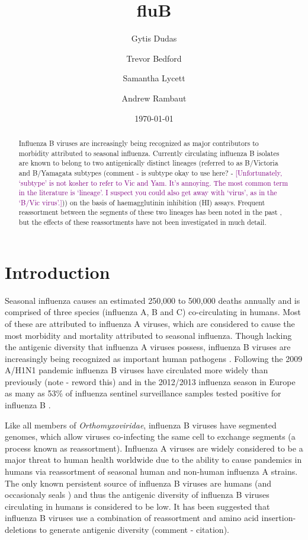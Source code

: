 \documentclass[11pt,oneside,letterpaper]{article}
\title{\vspace{1.0cm} \LARGE \bf fluB}
\author[1]{Gytis Dudas}
\author[1]{Trevor Bedford}
\author[1]{Samantha Lycett}
\author[1,2]{Andrew Rambaut}
\affil[1]{Institute of Evolutionary Biology, University of Edinburgh, Edinburgh, UK}
\affil[2]{Fogarty International Center, National Institutes of Health, Bethesda, MD, USA.}
\date{\today}
\def\tbc#1{\textcolor{purple}{[#1]}}
\begin{document}
\maketitle

\begin{abstract}

Influenza B viruses are increasingly being recognized as major contributors to morbidity attributed to seasonal influenza. 
Currently circulating influenza B isolates are known to belong to two antigenically distinct lineages (referred to as B/Victoria and B/Yamagata subtypes (comment - is subtype okay to use here? - \tbc{Unfortunately, `subtype' is not kosher to refer to Vic and Yam.  It's annoying.  The most common term in the literature is `lineage'.  I suspect you could also get away with `virus', as in the `B/Vic virus'.})) on the basis of haemagglutinin inhibition (HI) assays. 
Frequent reassortment between the segments of these two lineages has been noted in the past \cite{lindstrom1999}, but the effects of these reassortments have not been investigated in much detail.

\end{abstract}

\pagebreak


\section*{Introduction}
Seasonal influenza causes an estimated 250,000 to 500,000 deaths annually and is comprised of three species (influenza A, B and C) co-circulating in humans.
Most of these are attributed to influenza A viruses, which are considered to cause the most morbidity and mortality attributed to seasonal influenza.
Though lacking the antigenic diversity that influenza A viruses possess, influenza B viruses are increasingly being recognized as important human pathogens \cite{paul-glezen2013}.
Following the 2009 A/H1N1 pandemic influenza B viruses have circulated more widely than previously (note - reword this) and in the 2012/2013 influenza season in Europe as many as 53\% of influenza sentinel surveillance samples tested positive for influenza B \cite{ECDC1213}. 

Like all members of \textit{Orthomyxoviridae}, influenza B viruses have segmented genomes, which allow viruses co-infecting the same cell to exchange segments (a process known as reassortment). 
Influenza A viruses are widely considered to be a major threat to human health worldwide due to the ability to cause pandemics in humans via reassortment of seasonal human and non-human influenza A strains. 
The only known persistent source of influenza B viruses are humans (and occasionaly seals \cite{osterhaus2000}) and thus the antigenic diversity of influenza B viruses circulating in humans is considered to be low. 
It has been suggested that influenza B viruses use a combination of reassortment and amino acid insertion-deletions to generate antigenic diversity (comment - citation).
\end{document}
